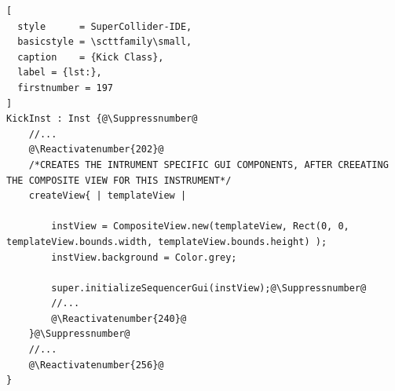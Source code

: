 \documentclass[main.tex]{subfiles}
\begin{document}
\begin{lstlisting}[
  style      = SuperCollider-IDE,
  basicstyle = \scttfamily\small,
  caption    = {Kick Class},
  label = {lst:},
  firstnumber = 197
]
KickInst : Inst {@\Suppressnumber@
	//...
	@\Reactivatenumber{202}@
	/*CREATES THE INTRUMENT SPECIFIC GUI COMPONENTS, AFTER CREEATING THE COMPOSITE VIEW FOR THIS INSTRUMENT*/
	createView{ | templateView |

		instView = CompositeView.new(templateView, Rect(0, 0, templateView.bounds.width, templateView.bounds.height) );
		instView.background = Color.grey;

		super.initializeSequencerGui(instView);@\Suppressnumber@
		//...
		@\Reactivatenumber{240}@
	}@\Suppressnumber@
	//...
	@\Reactivatenumber{256}@
}
\end{lstlisting}
\end{document}
